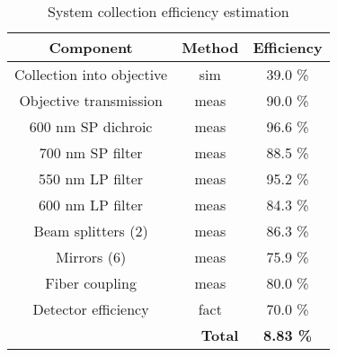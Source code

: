 \documentclass[reprint,onecolumn]{revtex4-1}
\begin{document}
\begin{table}
\caption{System collection efficiency estimation}\label{tab: Coll_eff}
\begin{centering}
\begin{tabular}{|c|c|c|}
\hline 
Component & Method & Efficiency\tabularnewline
\hline 
\hline 
Collection into objective & sim & 39.0 \%\tabularnewline
\hline 
Objective transmission & meas & 90.0 \%\tabularnewline
\hline 
600 nm SP dichroic & meas & 96.6 \%\tabularnewline
\hline 
700 nm SP filter & meas & 88.5 \%\tabularnewline
\hline 
550 nm LP filter & meas & 95.2 \%\tabularnewline
\hline 
600 nm LP filter & meas & 84.3 \%\tabularnewline
\hline 
Beam splitters (2) & meas & 86.3 \%\tabularnewline
\hline 
Mirrors (6) & meas & 75.9 \%\tabularnewline
\hline 
Fiber coupling & meas & 80.0 \%\tabularnewline
\hline 
Detector efficiency & fact & 70.0 \%\tabularnewline
\hline 
\multicolumn{2}{|r|}{\textbf{Total}} & \textbf{8.83 \%}\tabularnewline
\hline 
\end{tabular}
\par\end{centering}


\end{table}
\end{document}

